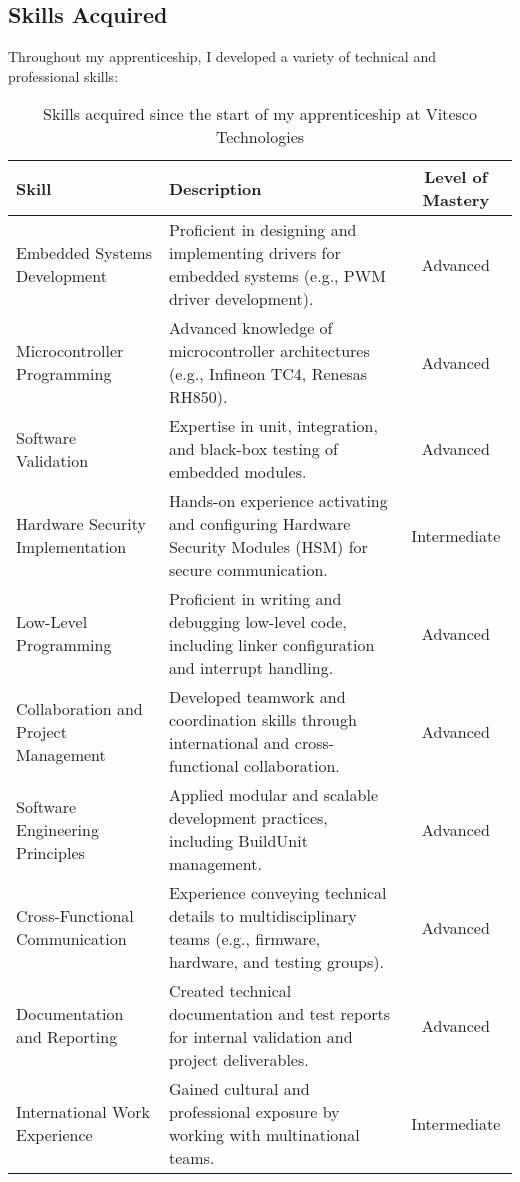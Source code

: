 \subsection{Skills Acquired}
Throughout my apprenticeship, I developed a variety of technical and professional skills:
\begin{table}[H]
    \centering
    \renewcommand{\arraystretch}{1.5} %
    \begin{tabular}{|p{3.5cm}|p{8cm}|c|}
        \hline
        \rowcolor[gray]{0.8}
        \textbf{Skill} & \textbf{Description} & \textbf{Level of Mastery} \\
        \hline
        Embedded Systems Development & Proficient in designing and implementing drivers for embedded systems (e.g., PWM driver development). & Advanced \\
        \hline
        Microcontroller Programming & Advanced knowledge of microcontroller architectures (e.g., Infineon TC4, Renesas RH850). & Advanced \\
        \hline
        Software Validation & Expertise in unit, integration, and black-box testing of embedded modules. & Advanced \\
        \hline
        Hardware Security Implementation & Hands-on experience activating and configuring Hardware Security Modules (HSM) for secure communication. & Intermediate \\
        \hline
        Low-Level Programming & Proficient in writing and debugging low-level code, including linker configuration and interrupt handling. & Advanced \\
        \hline
        Collaboration and Project Management & Developed teamwork and coordination skills through international and cross-functional collaboration. & Advanced \\
        \hline
        Software Engineering Principles & Applied modular and scalable development practices, including BuildUnit management. & Advanced \\
        \hline
        Cross-Functional Communication & Experience conveying technical details to multidisciplinary teams (e.g., firmware, hardware, and testing groups). & Advanced \\
        \hline
        Documentation and Reporting & Created technical documentation and test reports for internal validation and project deliverables. & Advanced \\
        \hline
        International Work Experience & Gained cultural and professional exposure by working with multinational teams. & Intermediate \\
        \hline
    \end{tabular}
    \caption{Skills acquired since the start of my apprenticeship at Vitesco Technologies}
\end{table}

